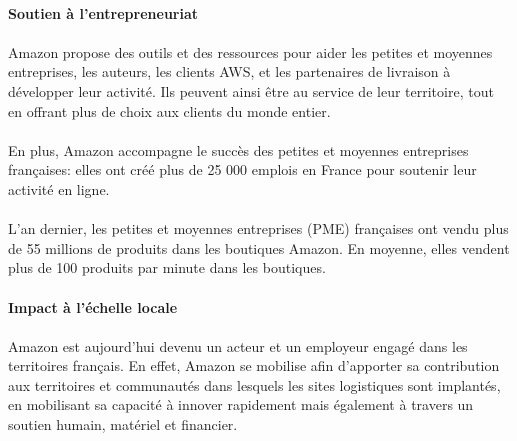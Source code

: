 \paragraph{}
\vspace{-2em}  %

{\large\textbf{Soutien à l'entrepreneuriat}}
\paragraph{}
\vspace{-3em}  %
Amazon propose des outils et des ressources pour aider les petites et moyennes entreprises, les auteurs, les clients AWS, et les partenaires de livraison à développer leur activité. Ils peuvent ainsi être au service de leur territoire, tout en offrant plus de choix aux clients du monde entier.
\paragraph{}
\vspace{-2em}  %
En plus, Amazon accompagne le succès des petites et moyennes entreprises françaises: elles ont créé plus de 25 000 emplois en France pour soutenir leur activité en ligne.
\paragraph{}
\vspace{-2em}
L'an dernier, les petites et moyennes entreprises (PME) françaises ont vendu plus de 55 millions de produits dans les boutiques Amazon. En moyenne, elles vendent plus de 100 produits par minute dans les boutiques.
\paragraph{}
\vspace{-2em}  %

{\large\textbf{Impact à l'échelle locale}}
\paragraph{}
\vspace{-3em}  %
Amazon est aujourd'hui devenu un acteur et un employeur engagé dans les territoires français. En effet, Amazon se mobilise afin d'apporter sa contribution aux territoires et communautés dans lesquels les sites logistiques sont implantés, en mobilisant sa capacité à innover rapidement mais également à travers un soutien humain, matériel et financier.
